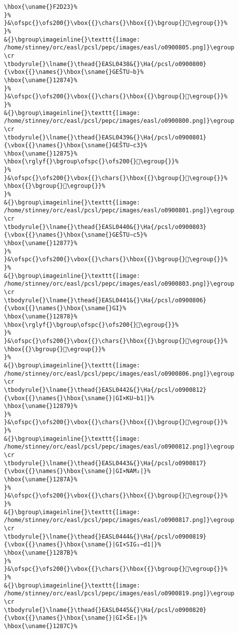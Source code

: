 \begin{verbatim}
\hbox{\uname{}F2D23}%
}%
}&\ofspc{}\ofs200{}\vbox{{}\chars{}\hbox{{}\bgroup{}󲴣\egroup{}}%
}%
&{}\bgroup\imageinline{}\texttt{[image: /home/stinney/orc/easl/pcsl/pepc/images/easl/o0900805.png]}\egroup
\cr
\tbodyrule{}\lname{}\thead{}EASL0438&{}\Ha{/pcsl/o0900800}{\vbox{{}\names{}\hbox{\sname{}GEŠTU∼b}%
\hbox{\uname{}12874}%
}%
}&\ofspc{}\ofs200{}\vbox{{}\chars{}\hbox{{}\bgroup{}𒡴\egroup{}}%
}%
&{}\bgroup\imageinline{}\texttt{[image: /home/stinney/orc/easl/pcsl/pepc/images/easl/o0900800.png]}\egroup
\cr
\tbodyrule{}\lname{}\thead{}EASL0439&{}\Ha{/pcsl/o0900801}{\vbox{{}\names{}\hbox{\sname{}GEŠTU∼c3}%
\hbox{\uname{}12875}%
\hbox{\rglyf{}\bgroup\ofspc{}\ofs200{}𒡵\egroup{}}%
}%
}&\ofspc{}\ofs200{}\vbox{{}\chars{}\hbox{{}\bgroup{}𒡵\egroup{}}%
\hbox{{}\bgroup{}𒡶\egroup{}}%
}%
&{}\bgroup\imageinline{}\texttt{[image: /home/stinney/orc/easl/pcsl/pepc/images/easl/o0900801.png]}\egroup
\cr
\tbodyrule{}\lname{}\thead{}EASL0440&{}\Ha{/pcsl/o0900803}{\vbox{{}\names{}\hbox{\sname{}GEŠTU∼c5}%
\hbox{\uname{}12877}%
}%
}&\ofspc{}\ofs200{}\vbox{{}\chars{}\hbox{{}\bgroup{}𒡷\egroup{}}%
}%
&{}\bgroup\imageinline{}\texttt{[image: /home/stinney/orc/easl/pcsl/pepc/images/easl/o0900803.png]}\egroup
\cr
\tbodyrule{}\lname{}\thead{}EASL0441&{}\Ha{/pcsl/o0900806}{\vbox{{}\names{}\hbox{\sname{}GI}%
\hbox{\uname{}12878}%
\hbox{\rglyf{}\bgroup\ofspc{}\ofs200{}𒡸\egroup{}}%
}%
}&\ofspc{}\ofs200{}\vbox{{}\chars{}\hbox{{}\bgroup{}𒢄\egroup{}}%
\hbox{{}\bgroup{}𒡸\egroup{}}%
}%
&{}\bgroup\imageinline{}\texttt{[image: /home/stinney/orc/easl/pcsl/pepc/images/easl/o0900806.png]}\egroup
\cr
\tbodyrule{}\lname{}\thead{}EASL0442&{}\Ha{/pcsl/o0900812}{\vbox{{}\names{}\hbox{\sname{}|GI×KU∼b1|}%
\hbox{\uname{}12879}%
}%
}&\ofspc{}\ofs200{}\vbox{{}\chars{}\hbox{{}\bgroup{}𒡹\egroup{}}%
}%
&{}\bgroup\imageinline{}\texttt{[image: /home/stinney/orc/easl/pcsl/pepc/images/easl/o0900812.png]}\egroup
\cr
\tbodyrule{}\lname{}\thead{}EASL0443&{}\Ha{/pcsl/o0900817}{\vbox{{}\names{}\hbox{\sname{}|GI×NAM₂|}%
\hbox{\uname{}1287A}%
}%
}&\ofspc{}\ofs200{}\vbox{{}\chars{}\hbox{{}\bgroup{}𒡺\egroup{}}%
}%
&{}\bgroup\imageinline{}\texttt{[image: /home/stinney/orc/easl/pcsl/pepc/images/easl/o0900817.png]}\egroup
\cr
\tbodyrule{}\lname{}\thead{}EASL0444&{}\Ha{/pcsl/o0900819}{\vbox{{}\names{}\hbox{\sname{}|GI×SIG₂∼d1|}%
\hbox{\uname{}1287B}%
}%
}&\ofspc{}\ofs200{}\vbox{{}\chars{}\hbox{{}\bgroup{}𒡻\egroup{}}%
}%
&{}\bgroup\imageinline{}\texttt{[image: /home/stinney/orc/easl/pcsl/pepc/images/easl/o0900819.png]}\egroup
\cr
\tbodyrule{}\lname{}\thead{}EASL0445&{}\Ha{/pcsl/o0900820}{\vbox{{}\names{}\hbox{\sname{}|GI×ŠE₃|}%
\hbox{\uname{}1287C}%

\end{verbatim}
